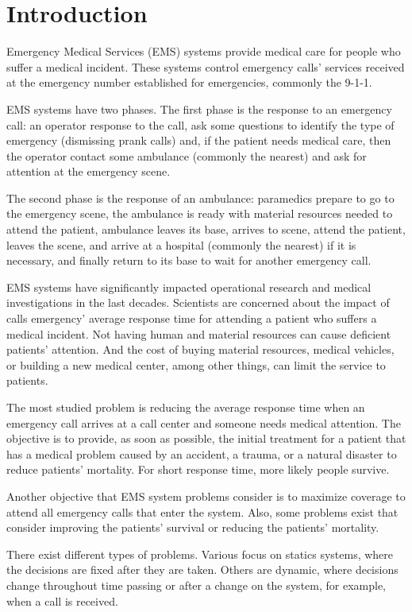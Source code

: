 \chapter{Introduction}

Emergency Medical Services (EMS) systems provide medical care for people who suffer a medical incident. These systems control emergency calls' services received at the emergency number established for emergencies, commonly the 9-1-1. 

EMS systems have two phases. The first phase is the response to an emergency call: an operator response to the call, ask some questions to identify the type of emergency (dismissing prank calls) and, if the patient needs medical care, then the operator contact some ambulance (commonly the nearest) and ask for attention at the emergency scene. 

The second phase is the response of an ambulance: paramedics prepare to go to the emergency scene, the ambulance is ready with material resources needed to attend the patient, ambulance leaves its base, arrives to scene, attend the patient, leaves the scene, and arrive at a hospital (commonly the nearest) if it is necessary, and finally return to its base to wait for another emergency call.

EMS systems have significantly impacted operational research and medical investigations in the last decades. Scientists are concerned about the impact of calls emergency' average response time for attending a patient who suffers a medical incident. Not having human and material resources can cause deficient patients' attention. And the cost of buying material resources, medical vehicles, or building a new medical center, among other things, can limit the service to patients.

The most studied problem is reducing the average response time when an emergency call arrives at a call center and someone needs medical attention. 
The objective is to provide, as soon as possible, the initial treatment for a patient that has a medical problem caused by an accident, a trauma, or a natural disaster to reduce patients' mortality. For short response time, more likely people survive. 

Another objective that EMS system problems consider is to maximize coverage to attend all emergency calls that enter the system. Also, some problems exist that consider improving the patients' survival or reducing the patients' mortality. 

There exist different types of problems. Various focus on statics systems, where the decisions are fixed after they are taken. Others are dynamic, where decisions change throughout time passing or after a change on the system, for example, when a call is received.

